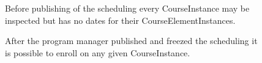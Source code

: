 \begin{multicols}{2}

\begin{figure}[H]
%
\caption{Before publishing of the scheduling every CourseInstance may be inspected but has no dates for their CourseElementInstances.}%
\end{figure}

\begin{figure}[H]
%
\caption{After the program manager published and freezed the scheduling it is possible to enroll on any given CourseInstance.}%
\end{figure}

\end{multicols}
